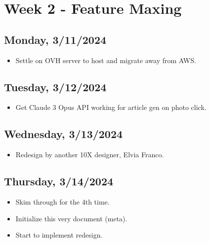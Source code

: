 \newpage
\section{Week 2 - Feature Maxing}

\subsection*{Monday, 3/11/2024}
\begin{itemize}
    \item Settle on OVH server to host and migrate away from AWS.
\end{itemize}

\subsection*{Tuesday, 3/12/2024}
\begin{itemize}
    \item Get Claude 3 Opus API working for article gen on photo click.
\end{itemize}

\subsection*{Wednesday, 3/13/2024}
\begin{itemize}
    \item Redesign by another 10X designer, Elvia Franco. 
\end{itemize}

\subsection*{Thursday, 3/14/2024}
\begin{itemize}
    \item Skim through \cite{huyen2022designing} for the 4th time.
    \item Initialize this very document (meta).
    \item Start to implement redesign.
\end{itemize}
